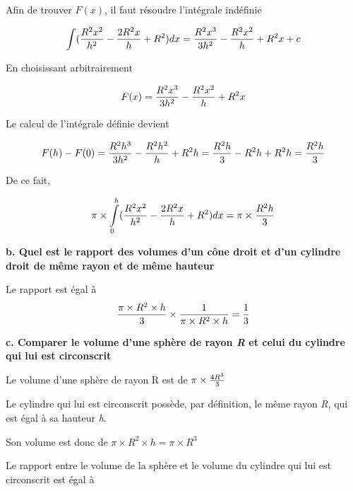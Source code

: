 \documentclass[10pt]{article}
\begin{document}
Afin de trouver $F(x)$, il faut résoudre l'intégrale indéfinie\vspace{0.2cm}

$$\int({R^2x^2\over{h^2}}-{2R^2x\over{h}}+R^2)dx={R^2x^3\over{3}h^2}-{R^2x^2\over{h}}+R^2x+c$$\vspace{0.01cm}

En choisissant arbitrairement

$$F(x)={R^2x^3\over{3}h^2}-{R^2x^2\over{h}}+R^2x$$\vspace{0.01cm}

Le calcul de l'intégrale définie devient\vspace{0.2cm}

$$F(h)-F(0)={R^2h^3\over{3}h^2}-{R^2h^2\over{h}}+R^2h={R^2h\over{3}}-R^2h+R^2h={R^2h\over{3}}$$\vspace{0.01cm}

De ce fait,

$$\pi\times\int\limits_0^h({R^2x^2\over{h^2}}-{2R^2x\over{h}}+R^2)dx=\pi\times{R^2h\over{3}}$$


\newpage
\flushleft \textbf{b. Quel est le rapport des volumes d'un cône droit et d'un cylindre droit de même rayon et de même hauteur}\vspace{0.5cm}

Le rapport est égal à $$\displaystyle{\pi \times R^2 \times h \over{3}} \times {1\over{\pi \times R^2 \times h}}={1\over{3}}$$

\flushleft \textbf{c. Comparer le volume d'une sphère de rayon \textit{R} et celui du cylindre qui lui est circonscrit}\vspace{0.5cm}

Le volume d'une sphère de rayon R est de $\pi\times{4R^3\over{3}}$\vspace{0.5cm}

Le cylindre qui lui est circonscrit possède, par définition, le même rayon \textit{R}, qui est égal à sa hauteur \textit{h}.\vspace{0.5cm}

Son volume est donc de $\pi \times R^2 \times h=\pi \times R^3$ \vspace{0.5cm}

Le rapport entre le volume de la sphère et le volume du cylindre qui lui est circonscrit est égal à
\end{document}

